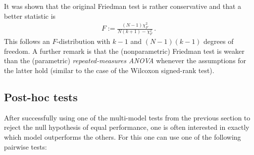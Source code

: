     \begin{remark}
        It was shown that the original Friedman test is rather conservative and that a better statistic is
        \begin{gather}
            F := \frac{(N-1)\chi^2_F}{N(k+1)-\chi^2_F}\,.
        \end{gather}
        This follows an $F$-distribution with $k-1$ and $(N-1)(k-1)$ degrees of freedom. A further remark is that the (nonparametric) Friedman test is weaker than the (parametric) \textit{repeated-measures ANOVA} whenever the assumptions for the latter hold (similar to the case of the Wilcoxon signed-rank test).
    \end{remark}

\subsection{Post-hoc tests}

    After successfully using one of the multi-model tests from the previous section to reject the null hypothesis of equal performance, one is often interested in exactly which model outperforms the others. For this one can use one of the following pairwise tests:

